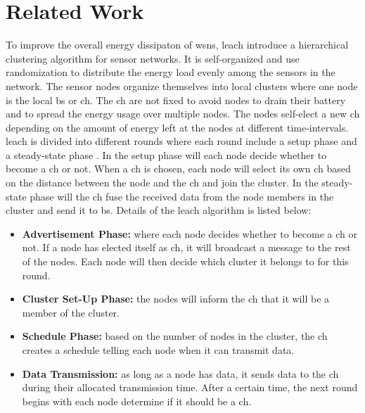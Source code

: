 \documentclass[USenglish]{uit-thesis}
\begin{document}
\chapter{Related Work} \label{chap:related_work}
\glsresetall
To improve the overall energy dissipaton of \gls{wsn}s, \gls{leach} \cite{leach} introduce a hierarchical clustering algorithm for sensor networks. It is self-organized and use randomization to distribute the energy load evenly among the sensors in the network. The sensor nodes organize themselves into local clusters where one node is the local \gls{bs} or \gls{ch}. The \gls{ch} are not fixed to avoid nodes to drain their battery and to spread the energy usage over multiple nodes. The nodes self-elect a new \gls{ch} depending on the amount of energy left at the nodes at different time-intervals. \gls{leach} is divided into different rounds where each round include a setup phase and a steady-state phase \cite{tree_based}. In the setup phase will each node decide whether to become a \gls{ch} or not. When a \gls{ch} is chosen, each node will select its own \gls{ch} based on the distance between the node and the \gls{ch} and join the cluster. In the steady-state phase will the \gls{ch} fuse the received data from the node members in the cluster and send it to \gls{bs}. Details of the \gls{leach} algorithm is listed below:

\begin{itemize}
\item \textbf{Advertisement Phase:} where each node decides whether to become a \gls{ch} or not. If a node has elected itself as \gls{ch}, it will broadcast a message to the rest of the nodes. Each node will then decide which cluster it belongs to for this round.
\item \textbf{Cluster Set-Up Phase:} the nodes will inform the \gls{ch} that it will be a member of the cluster.
\item \textbf{Schedule Phase:} based on the number of nodes in the cluster, the \gls{ch} creates a schedule telling each node when it can transmit data.
\item \textbf{Data Transmission:} as long as a node has data, it sends data to the \gls{ch} during their allocated transmission time. After a certain time, the next round begins with each node determine if it should be a \gls{ch}. 
\end{itemize}
\end{document}
